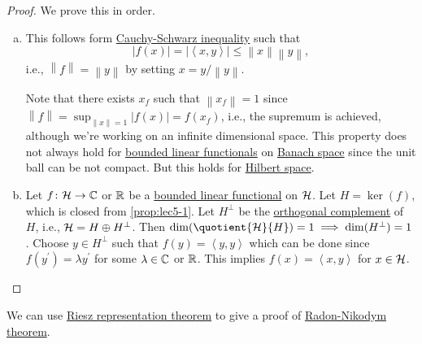 \begin{proof}
	We prove this in order.
	\begin{enumerate}[(a)]
		\item This follows form \hyperref[thm:Cauchy-Schwarz-ineq]{Cauchy-Schwarz inequality} such that
		      \[
			      \left\vert f(x) \right\vert = \left\vert \left\langle x, y \right\rangle  \right\vert \leq \left\lVert x\right\rVert \left\lVert y\right\rVert ,
		      \]
		      i.e., \(\left\lVert f\right\rVert = \left\lVert y\right\rVert \) by setting \(x = y / \left\lVert y\right\rVert \).
		      \begin{note}
			      Note that there exists \(x_f\) such that \(\left\lVert x_f\right\rVert = 1\) since \(\left\lVert f\right\rVert = \sup _{\left\lVert x\right\rVert = 1} \left\vert f(x) \right\vert = f(x_f)\), i.e., the supremum is achieved, although we're working on an infinite dimensional space. This property does not always hold for \hyperref[def:bounded-linear-functional]{bounded linear functionals} on \hyperref[def:Banach-space]{Banach space} since the unit ball can be not compact. But this holds for \hyperref[def:Hilbert-space]{Hilbert space}.
		      \end{note}
		\item Let \(f\colon \mathcal{\MakeUppercase{h}} \to \mathbb{\MakeUppercase{c}} \) or \(\mathbb{\MakeUppercase{r}} \) be a \hyperref[def:bounded-linear-functional]{bounded linear functional} on \(\mathcal{\MakeUppercase{h}} \). Let \(H = \ker(f)\), which is closed from \autoref{prop:lec5-1}. Let \(H ^\perp\) be the \hyperref[def:orthogonal-complement]{orthogonal complement} of \(H\), i.e., \(\mathcal{\MakeUppercase{h}} = H\oplus H^\perp\). Then \(\dim (\quotient{\mathcal{\MakeUppercase{h}} }{H} )= 1\implies \dim(H^\perp) = 1\). Choose \(y\in H^\perp\) such that \(f(y) = \left\langle y, y \right\rangle \) which can be done since \(f(y^\prime ) = \lambda y^\prime \) for some \(\lambda \in \mathbb{\MakeUppercase{c}} \) or \(\mathbb{\MakeUppercase{r}} \). This implies \(f(x) = \left\langle x, y \right\rangle \) for \(x\in \mathcal{\MakeUppercase{h}} \).
	\end{enumerate}
\end{proof}

We can use \hyperref[thm:Riesz-representation]{Riesz representation theorem} to give a proof of \href{https://en.wikipedia.org/wiki/Radon%E2%80%93Nikodym_theorem}{Radon-Nikodym theorem}. 


